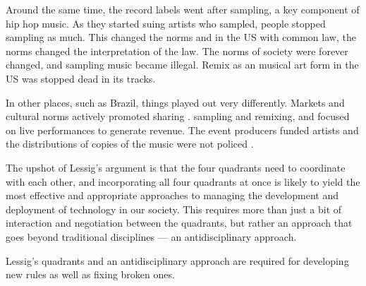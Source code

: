Around the same time, the record labels went after sampling, a key component of hip hop music. As they started suing artists who sampled, people stopped sampling as much. This changed the norms and in the US with common law, the norms changed the interpretation of the law. The norms of society were forever changed, and sampling music became illegal. Remix as an musical art form in the US was stopped dead in its tracks.

In other places, such as Brazil, things played out very differently. Markets and cultural norms actively promoted sharing . sampling and remixing, and focused on live performances to generate revenue. The event producers funded artists and the distributions of copies of the music were not policed \cite{shaver2010access}.

The upshot of Lessig's argument is that the four quadrants need to coordinate with each other, and incorporating all four quadrants at once is likely to yield the most effective and appropriate approaches to managing the development and deployment of technology in our society. This requires more than just a bit of interaction and negotiation between the quadrants, but rather an approach that goes beyond traditional disciplines --- an antidisciplinary approach.

Lessig's quadrants and an antidisciplinary approach are required for developing new rules as well as fixing broken ones.

